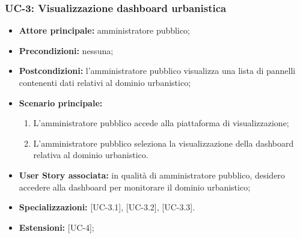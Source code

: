 \documentclass[8pt]{article}
\begin{document}
\subsubsection*{UC-3: Visualizzazione dashboard urbanistica}
\begin{itemize}
    \item \textbf{Attore principale:} amministratore pubblico;
    \item \textbf{Precondizioni: }nessuna;
    \item \textbf{Postcondizioni:} l'amministratore pubblico visualizza una lista di pannelli
        contenenti dati relativi al dominio urbanistico;
    \item \textbf{Scenario principale:} 
    \begin{enumerate}
    \item L’amministratore pubblico accede alla piattaforma di visualizzazione;
    \item L’amministratore pubblico seleziona la visualizzazione della dashboard relativa al dominio
        urbanistico.
    \end{enumerate}
    \item \textbf{User Story associata:} in qualità di amministratore pubblico, desidero accedere
        alla dashboard per monitorare il dominio urbanistico;
    \item \textbf {Specializzazioni:} [UC-3.1], [UC-3.2], [UC-3.3].
    \item \textbf{Estensioni:} [UC-4];
\end{itemize}
\end{document}
